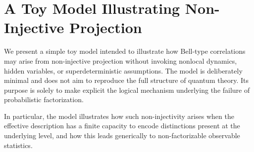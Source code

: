 \section{A Toy Model Illustrating Non-Injective Projection}
  \label{app:toy-model}

  We present a simple toy model intended to illustrate how Bell-type correlations may
  arise from non-injective projection without invoking nonlocal dynamics, hidden
  variables, or superdeterministic assumptions.
  The model is deliberately minimal and does not aim to reproduce the full structure of quantum theory.
  Its purpose is solely to make explicit the logical mechanism underlying the failure
  of probabilistic factorization.

  In particular, the model illustrates how such non-injectivity arises when the
  effective description has a finite capacity to encode distinctions present at the
  underlying level, and how this leads generically to non-factorizable observable
  statistics.

  
  
  
  
  
  
